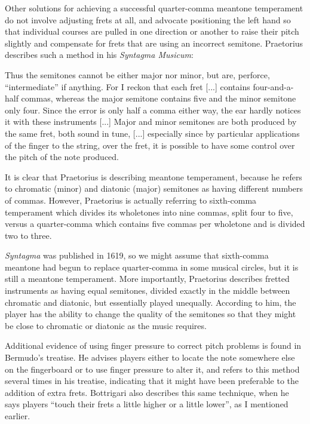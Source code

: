 Other solutions for achieving a successful quarter-comma meantone temperament do not involve
adjusting frets at all, and advocate positioning the left hand so that individual courses are pulled in
one direction or another to raise their pitch slightly and compensate for frets that are using an
incorrect semitone. Praetorius describes such a method in his \textit{Syntagma Musicum}:
\begin{blocks}
Thus the semitones cannot be either major nor minor, but are, perforce, ``intermediate''
if anything. For I reckon that each fret [...] contains four-and-a-half commas, whereas
the major semitone contains five and the minor semitone only four. Since the error is
only half a comma either way, the ear hardly notices it with these instruments [...]
Major and minor semitones are both produced by the same fret, both sound in tune, [...]
especially since by particular applications of the finger to the string, over the fret,
it is possible to have some control over the pitch of the note produced.
\autocite[68]{MP:1}
\end{blocks}
It is clear that Praetorius is describing meantone temperament, because he
refers to chromatic (minor) and diatonic (major) semitones as having different numbers of
commas. However, Praetorius is actually referring to sixth-comma temperament
which divides its wholetones into nine commas, split four to five, versus a quarter-comma
which contains five commas per wholetone and is divided two to three.

\textit{Syntagma} was published in 1619, so we might assume that sixth-comma meantone had begun to replace quarter-comma
in some musical circles, but it is still a meantone temperament. More importantly, Praetorius describes fretted
instruments as having equal semitones, divided exactly in the middle between chromatic and diatonic, but essentially
played unequally. According to him, the player has the ability to change the quality of the semitones so that they might
be close to chromatic or diatonic as the music requires.

Additional evidence of using finger pressure to correct pitch problems is found in Bermudo's treatise. He advises
players either to locate the note somewhere else on the fingerboard or to use finger pressure to alter it, and refers to
this method several times in his treatise, indicating that it might have been preferable to the addition of extra frets.
\autocite[106]{DE:1} Bottrigari also describes this same technique, when he says players ``touch their frets a little
higher or a little lower'', as I mentioned earlier. \autocite[15]{HB:1}

